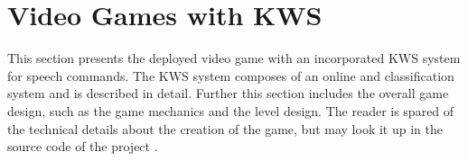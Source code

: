 
\chapter{Video Games with KWS}\label{sec:game}
This section presents the deployed video game with an incorporated KWS system for speech commands.
The KWS system composes of an online and classification system and is described in detail.
Further this section includes the overall game design, such as the game mechanics and the level design.
The reader is spared of the technical details about the creation of the game, but may look it up in the source code of the project \cite{KWSGame}.



